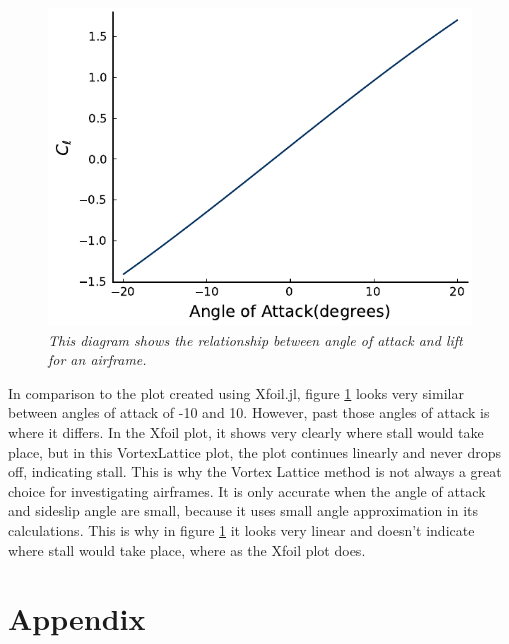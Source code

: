 \documentclass{journal}
\begin{document}
	\begin{figure}[H]
		\centering
		\includegraphics{../graphics/aoa-lift.pdf}
		\caption{\emph{This diagram shows the relationship between angle of attack and lift for an airframe.}}
		\label{fig:aoa-lift}
	\end{figure}

	In comparison to the plot created using Xfoil.jl, figure \ref{fig:aoa-lift} looks very similar between angles of attack of -10 and 10. However, past those angles of attack is where it differs. In the Xfoil plot, it shows very clearly where stall would take place, but in this VortexLattice plot, the plot continues linearly and never drops off, indicating stall. This is why the Vortex Lattice method is not always a great choice for investigating airframes. It is only accurate when the angle of attack and sideslip angle are small, because it uses small angle approximation in its calculations. This is why in figure \ref{fig:aoa-lift} it looks very linear and doesn't indicate where stall would take place, where as the Xfoil plot does.
 	
	\section*{Appendix}
	
\end{document}
